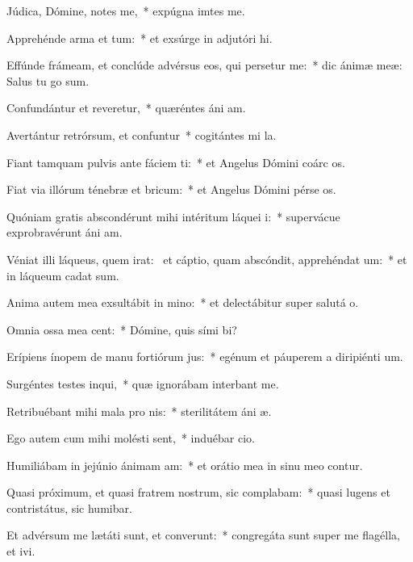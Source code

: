 \item Júdica, Dómine, notes me,~* expúgna imtes me.
\item Apprehénde arma et tum:~* et exsúrge in adjutóri hi.
\item Effúnde frámeam, et conclúde advérsus eos, qui persetur me:~* dic ánimæ meæ: Salus tu go sum.
\item Confundántur et reveretur,~* quæréntes áni am.
\item Avertántur retrórsum, et confuntur~* cogitántes mi la.
\item Fiant tamquam pulvis ante fáciem ti:~* et Angelus Dómini coárc os.
\item Fiat via illórum ténebræ et bricum:~* et Angelus Dómini pérse os.
\item Quóniam gratis abscondérunt mihi intéritum láquei i:~* supervácue exprobravérunt áni am.
\item Véniat illi láqueus, quem irat:~\pscross{} et cáptio, quam abscóndit, apprehéndat um:~* et in láqueum cadat  sum.
\item Anima autem mea exsultábit in mino:~* et delectábitur super salutá o.
\item Omnia ossa mea cent:~* Dómine, quis sími bi?
\item Erípiens ínopem de manu fortiórum jus:~* egénum et páuperem a diripiénti um.
\item Surgéntes testes inqui,~* quæ ignorábam interbant me.
\item Retribuébant mihi mala pro nis:~* sterilitátem áni æ.
\item Ego autem cum mihi molésti sent,~* induébar cio.
\item Humiliábam in jejúnio ánimam am:~* et orátio mea in sinu meo contur.
\item Quasi próximum, et quasi fratrem nostrum, sic complabam:~* quasi lugens et contristátus, sic humibar.
\item Et advérsum me lætáti sunt, et converunt:~* congregáta sunt super me flagélla, et ivi.

